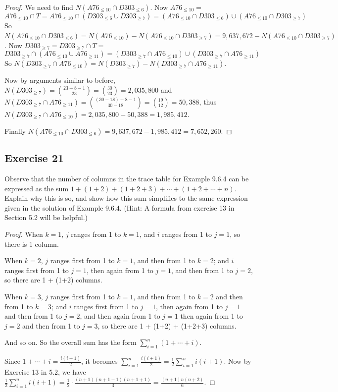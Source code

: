 \documentclass[14pt]{extarticle}
\newcommand{\dps}{\displaystyle}
\begin{document}
\begin{proof}
     We need to find \(N(A76_{\leq 10} \cap D303_{\leq 6})\). Now \(A76_{\leq 10} = \)
     \[
          A76_{\leq 10} \cap T = A76_{\leq 10} \cap (D303_{\leq 6} \cup D303_{\geq 7}) = (A76_{\leq 10} \cap
          D303_{\leq 6}) \cup (A76_{\leq 10} \cap D303_{\geq 7})
     \]
     So \(N(A76_{\leq 10} \cap D303_{\leq 6}) = N(A76_{\leq 10}) - N(A76_{\leq 10} \cap D303_{\geq 7}) = 9,637,672 -
     N(A76_{\leq 10} \cap D303_{\geq 7})\). Now \(D303_{\geq 7} = D303_{\geq 7} \cap T = \)
     \[
          D303_{\geq 7} \cap (A76_{\leq 10} \cup A76_{\geq 11}) = (D303_{\geq 7} \cap A76_{\leq 10}) \cup (D303_{\geq 7} \cap
          A76_{\geq 11})
     \]
     So \(N(D303_{\geq 7} \cap A76_{\leq 10}) = N(D303_{\geq 7}) - N(D303_{\geq 7} \cap A76_{\geq 11})\).

     Now by arguments similar to before, \(N(D303_{\geq 7}) = \binom{23+8-1}{23} = \binom{30}{23} = 2,035,800\) and
     \(N(D303_{\geq 7} \cap A76_{\geq 11}) = \binom{(30-18)+8-1}{30-18} = \binom{19}{12} = 50,388\), thus \(N(D303_{\geq 7}
     \cap A76_{\leq 10}) = 2,035,800 - 50,388 = 1,985,412\).

     Finally \(N(A76_{\leq 10} \cap D303_{\leq 6}) = 9,637,672 -
     1,985,412 = 7,652,260\).
\end{proof}

\subsection{Exercise 21}
Observe that the number of columns in the trace table for Example 9.6.4 can be expressed as the sum \(1 + (1 + 2) + (1 +
2 + 3) + \cdots + (1 + 2 + \cdots + n)\). Explain why this is so, and show how this sum simplifies to the same expression
given in the solution of Example 9.6.4. (Hint: A formula from exercise 13 in Section 5.2 will be helpful.)

\begin{proof}
     When \(k=1\), \(j\) ranges from 1 to \(k=1\), and \(i\) ranges from 1 to \(j=1\), so there is 1 column.

     When \(k=2\), \(j\) ranges first from 1 to \(k=1\), and then from 1 to \(k=2\); and \(i\) ranges first from 1 to \(j=1\),
     then again from 1 to \(j=1\), and then from 1 to \(j=2\), so there are 1 + (1+2) columns.

     When \(k=3\), \(j\) ranges first from 1 to \(k=1\), and then from 1 to \(k=2\) and then from 1 to \(k=3\); and \(i\) ranges
     first from 1 to \(j=1\), then again from 1 to \(j=1\) and then from 1 to \(j=2\), and then again from 1 to \(j=1\) then again
     from 1 to \(j=2\) and then from 1 to \(j=3\), so there are 1 + (1+2) + (1+2+3) columns.

     And so on. So the overall sum has the form \(\dps\sum_{i=1}^{n}(1+\cdots+i)\).

     Since \(1+\cdots+i = \frac{i(i+1)}{2}\),
     it becomes \(\dps \sum_{i=1}^{n}\frac{i(i+1)}{2} = \frac{1}{2}\sum_{i=1}^{n}i(i+1)\). Now by Exercise 13 in 5.2, we have
     \(\dps \frac{1}{2}\sum_{i=1}^{n}i(i+1) = \frac{1}{2} \cdot \frac{(n+1)(n+1-1)(n+1+1)}{3} = \frac{(n+1)n(n+2)}{6}\).
\end{proof}
\end{document}
